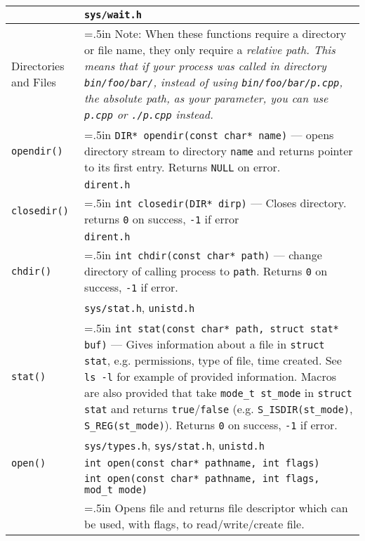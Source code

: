 \documentclass{article}
\newcommand{\indenth}[1][.5]{\hangindent=#1in
                         \hangafter=1 }
\begin{document}
\begin{longtabu}{p{1in}|p{5.7in}}
        \\
    & \texttt{sys/wait.h}
        \\ \hline
    Directories and Files & \indenth Note: When these functions require a directory or file name, they only require a \itshape relative path\rm. This means that if your process was called in directory \texttt{bin/foo/bar/}, instead of using \texttt{bin/foo/bar/p.cpp}, the \itshape absolute path\rm, as your parameter, you can use \texttt{p.cpp} or \texttt{./p.cpp} instead. \par
        \\
    \texttt{opendir()} & \indenth\texttt{DIR* opendir(const char* name)} --- opens directory stream to directory \texttt{name} and returns pointer to its first entry. Returns \texttt{NULL} on error. 
        \\
    & \texttt{dirent.h}
        \\
    \texttt{closedir()} & \indenth\texttt{int closedir(DIR* dirp)} --- Closes  directory. returns \texttt{0} on success, \texttt{-1} if error
        \\
    & \texttt{dirent.h}
        \\
    \texttt{chdir()} & \indenth\texttt{int chdir(const char* path)} --- change directory of calling process to \texttt{path}. Returns \texttt{0} on success, \texttt{-1} if error.
        \\
    & \texttt{sys/stat.h}, \texttt{unistd.h}
        \\
    \texttt{stat()} & \indenth\texttt{int stat(const char* path,  struct stat* buf)} --- Gives information about a file in \texttt{struct stat}, e.g. permissions, type of file, time created. See \texttt{ls -l} for example of provided information. Macros are also provided that take \texttt{mode\_t st\_mode} in \texttt{struct stat} and returns \texttt{true}/\texttt{false} (e.g. \texttt{S\_ISDIR(st\_mode)}, \texttt{S\_REG(st\_mode)}). Returns \texttt{0} on success, \texttt{-1} if error.
        \\
    & \texttt{sys/types.h}, \texttt{sys/stat.h}, \texttt{unistd.h}
        \\ \hline
    \texttt{open()} & \texttt{int open(const char* pathname, int flags)}
        \\
    & \texttt{int open(const char* pathname, int flags, mod\_t mode)}
        \\
    & \indenth Opens file and returns file descriptor which can be used, with flags, to read/write/create file. 

\end{longtabu}
\end{document}
